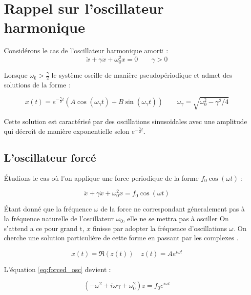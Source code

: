 \chapter{Rappel sur l'oscillateur harmonique}

Considérons le cas de l'oscillateur harmonique amorti :
\begin{dmath}
    \ddot{x} + \gamma\dot{x} + \omega_0^2 x = 0
    \qquad {\gamma > 0}
\end{dmath}   

Lorsque $\omega_0 > \frac{\gamma}{2}$ le système oscille de manière pseudopériodique et admet des solutions de la forme :

\begin{dmath}
    x(t) = e^{-\frac{\gamma}{2}t}(A\cos(\omega_{\gamma} t) + B\sin(\omega_{\gamma} t))
    \qquad {\omega_{\gamma} = \sqrt{\omega_0^2 - \gamma^2/4}}
\end{dmath}

Cette solution est caractérisé par des oscillations sinusoïdales avec une amplitude qui décroît de manière exponentielle selon $e^{-\frac{\gamma}{2} t}$.

\section{L'oscillateur forcé}

Étudions le cas où l’on applique une force periodique de la forme $f_0\cos(\omega t)$ :

\begin{dmath}
    \ddot{x} + \gamma\dot{x} + \omega_0^2 x = f_0\cos(\omega t)
    \label{eq:forced_osc}
\end{dmath}



Étant donné que la fréquence $\omega$ de la force ne correspondant 
géneralement pas à la fréquence naturelle de l'oscillateur $\omega_0$, 
elle ne se mettra pas à osciller 
On s'attend a ce pour grand t, $x$ finisse par adopter la 
fréquence d'oscillations $\omega$. 
On cherche une solution particulière de cette forme en passant 
par les complexes \cite{feynman_feynman_nodate}.

\begin{equation}
    x(t) = \Re(z(t)) \quad z(t) = Ae^{i\omega t}
\end{equation}

L'équation \eqref{eq:forced_osc} devient :

\begin{equation}
    (-\omega^2 + i\omega\gamma + \omega_0^2)z = f_0 e^{i\omega t}
\end{equation}

